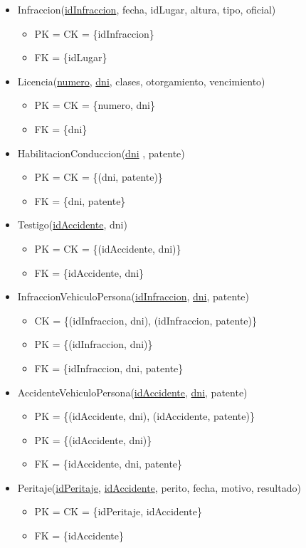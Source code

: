 \begin{itemize}
\item Infraccion(\underline{idInfraccion}, fecha, idLugar, altura, tipo, oficial)
  \begin{itemize}
  \item[] PK = CK = \{idInfraccion\}
  \item[] FK = \{idLugar\}
  \end{itemize}

\item Licencia(\underline{numero}, \underline{dni}, clases, otorgamiento, vencimiento)
  \begin{itemize}
  \item[] PK = CK = \{numero, dni\}
  \item[] FK = \{dni\}
  \end{itemize}

\item HabilitacionConduccion(\underline{dni} , patente)
  \begin{itemize}
  \item[] PK = CK = \{(dni, patente)\}
  \item[] FK = \{dni, patente\}
  \end{itemize}

\item Testigo(\underline{idAccidente}, dni)
  \begin{itemize}
  \item[] PK = CK = \{(idAccidente, dni)\}
  \item[] FK = \{idAccidente, dni\}
  \end{itemize}

\item InfraccionVehiculoPersona(\underline{idInfraccion}, \underline{dni}, patente)
  \begin{itemize}
  \item[] CK = \{(idInfraccion, dni), (idInfraccion, patente)\}
  \item[] PK = \{(idInfraccion, dni)\}
  \item[] FK = \{idInfraccion, dni, patente\}
  \end{itemize}

\item AccidenteVehiculoPersona(\underline{idAccidente}, \underline{dni}, patente)
  \begin{itemize}
  \item[] PK = \{(idAccidente, dni), (idAccidente, patente)\}
  \item[] PK = \{(idAccidente, dni)\}
  \item[] FK = \{idAccidente, dni, patente\}
  \end{itemize}


\item Peritaje(\underline{idPeritaje}, \underline{idAccidente}, perito, fecha, motivo, resultado)
  \begin{itemize}
  \item[] PK = CK = \{idPeritaje, idAccidente\}
  \item[] FK = \{idAccidente\}
  \end{itemize}

\end{itemize}